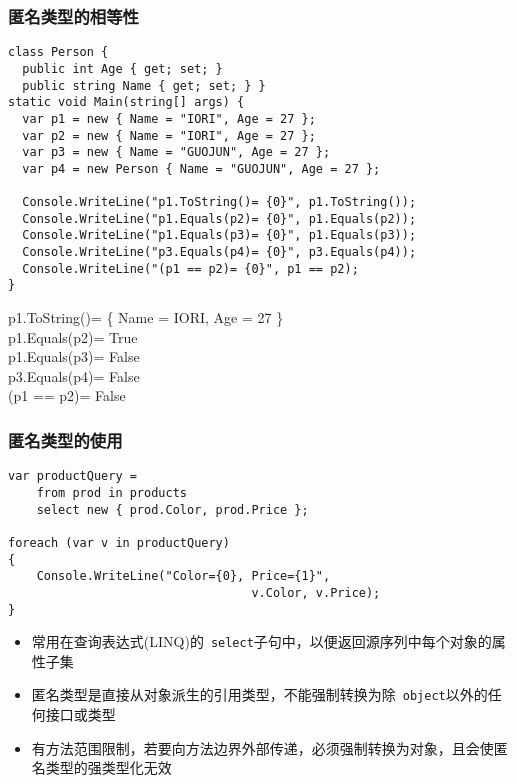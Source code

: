 \begin{frame}[fragile]
\frametitle{匿名类型的相等性}
\lstset{basicstyle=\ttfamily\scriptsize}
\begin{lstlisting}
class Person {
  public int Age { get; set; }
  public string Name { get; set; } }
static void Main(string[] args) {
  var p1 = new { Name = "IORI", Age = 27 };
  var p2 = new { Name = "IORI", Age = 27 };
  var p3 = new { Name = "GUOJUN", Age = 27 };
  var p4 = new Person { Name = "GUOJUN", Age = 27 };

  Console.WriteLine("p1.ToString()= {0}", p1.ToString());
  Console.WriteLine("p1.Equals(p2)= {0}", p1.Equals(p2));
  Console.WriteLine("p1.Equals(p3)= {0}", p1.Equals(p3));
  Console.WriteLine("p3.Equals(p4)= {0}", p3.Equals(p4));
  Console.WriteLine("(p1 == p2)= {0}", p1 == p2);
}
\end{lstlisting}
\scriptsize
p1.ToString()= \{ Name = IORI, Age = 27 \}\\
p1.Equals(p2)= True\\
p1.Equals(p3)= False\\
p3.Equals(p4)= False\\
(p1 == p2)= False\\
\end{frame}

\begin{frame}[fragile]
\frametitle{匿名类型的使用}
\begin{lstlisting}
var productQuery =
    from prod in products
    select new { prod.Color, prod.Price };

foreach (var v in productQuery)
{
    Console.WriteLine("Color={0}, Price={1}",
                                  v.Color, v.Price);
}
\end{lstlisting}
\begin{itemize}[<+->]
\item 常用在查询表达式(LINQ)的~\texttt{select}子句中，以便返回源序列中每个对象的属性子集
\item 匿名类型是直接从对象派生的引用类型，不能强制转换为除~\texttt{object}以外的任何接口或类型
\item 有方法范围限制，若要向方法边界外部传递，必须强制转换为对象，且会使匿名类型的强类型化无效
\end{itemize}
\end{frame}

